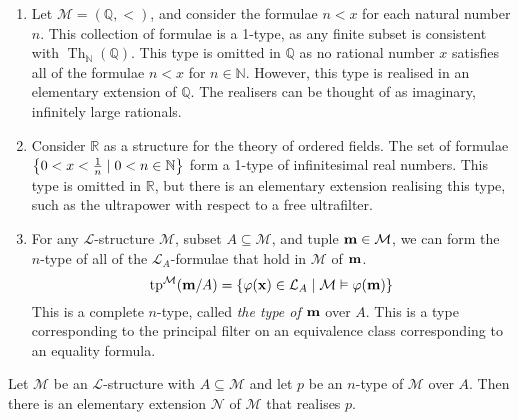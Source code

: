 \begin{example}
    \begin{enumerate}
        \item Let \( \mathcal M = (\mathbb Q, <) \), and consider the formulae \( n < x \) for each natural number \( n \).
        This collection of formulae is a 1-type, as any finite subset is consistent with \( \operatorname{Th}_{\mathbb N}(\mathbb Q) \).
        This type is omitted in \( \mathbb Q \) as no rational number \( x \) satisfies all of the formulae \( n < x \) for \( n \in \mathbb N \).
        However, this type is realised in an elementary extension of \( \mathbb Q \).
        The realisers can be thought of as imaginary, infinitely large rationals.
        \item Consider \( \mathbb R \) as a structure for the theory of ordered fields.
        The set of formulae \( \qty{0 < x < \frac{1}{n} \mid 0 < n \in \mathbb N} \) form a 1-type of infinitesimal real numbers.
        This type is omitted in \( \mathbb R \), but there is an elementary extension realising this type, such as the ultrapower with respect to a free ultrafilter.
        \item For any \( \mathcal L \)-structure \( \mathcal M \), subset \( A \subseteq \mathcal M \), and tuple \( \vb m \in \mathcal M \), we can form the \( n \)-type of all of the \( \mathcal L_A \)-formulae that hold in \( \mathcal M \) of \( \vb m \).
        \[ \operatorname{tp}^{\mathcal M}(\vb m/A) = \qty{\varphi(\vb x) \in \mathcal L_A \mid \mathcal M \vDash \varphi(\vb m)} \]
        This is a complete \( n \)-type, called \emph{the type of \( \vb m \)} over \( A \).
        This is a type corresponding to the principal filter on an equivalence class corresponding to an equality formula.
    \end{enumerate}
\end{example}
\begin{proposition}
    Let \( \mathcal M \) be an \( \mathcal L \)-structure with \( A \subseteq \mathcal M \) and let \( p \) be an \( n \)-type of \( \mathcal M \) over \( A \).
    Then there is an elementary extension \( \mathcal N \) of \( \mathcal M \) that realises \( p \).
\end{proposition}
